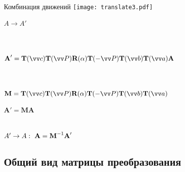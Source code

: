 \documentclass[10pt]{beamer}
\begin{document}
\begin{frame}{Комбинация движений}
	{
		\texttt{[image: translate3.pdf]}
	}
	{
		$A \rightarrow A' $ \\ ~ \\ \pause
		
		\hspace{1cm} \\[0.5em]
		$  \textbf{A}'=\textbf{T}(\vv c)\textbf{T}(\vv P)\textbf{R}(\alpha)\textbf{T}(-\vv P)\textbf{T}(\vv b)\textbf{T}(\vv a)\textbf{A}  $  \\[0.5em] 
		\hspace{1cm} 
		\\ ~ \\ \pause
		
		$ \textbf{M} = \textbf{T}(\vv c)\textbf{T}(\vv P)\textbf{R}(\alpha)\textbf{T}(-\vv P)\textbf{T}(\vv b)\textbf{T}(\vv a) $ 
		
		$\textbf{A}' = \textbf{M}\textbf{A}$ \\ ~ \\ \pause
		
		$A' \rightarrow A: \ \textbf{A}=\textbf{M}^{-1}\textbf A'$
		
		
	}


\end{frame}



\subsection{Общий вид матрицы преобразования}
\end{document}
